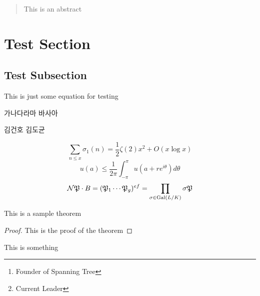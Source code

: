 \documentclass[]{sptr_article}
\author{Springer \and Frondosa \and Monoid\thanks{ Founder of Spanning Tree} \and concinnitas43\thanks{ Current Leader}}
\date{}
\begin{document}
\maketitle


\begin{abstract}
	This is an abstract
\end{abstract}

\tableofcontents

\section{Test Section}

\subsection{Test Subsection}

This is just some equation for testing

가나다라마 바사아

김건호 김도균

\begin{equation}
	\sum_{n \leq x} \sigma_1 (n) = \frac{1}{2} \zeta(2) x^2 + O(x \log x)
\end{equation}
\begin{equation}
	u(a) \leq \frac{1}{2\pi} \int_{-\pi}^\pi u(a + r e^{i \theta}) d\theta
\end{equation}
\begin{equation}
	\mathcal{N} \mathfrak{P} \cdot B = (\mathfrak{P}_1 \cdots \mathfrak{P}_g)^{ef} = \prod_{\sigma \in \operatorname{Gal}(L/K)} \sigma \mathfrak{P}
\end{equation}

\begin{theorem}
	This is a sample theorem
\end{theorem}

\begin{proof}
	This is the proof of the theorem
\end{proof}
This is something

\lipsum

\end{document}
